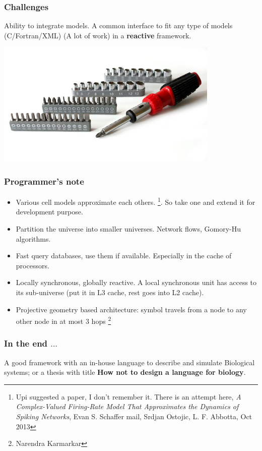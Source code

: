 \documentclass{beamer}
\begin{document}
\begin{frame}
\frametitle{Challenges}

Ability to integrate models. A common interface to fit any type of models
(C/Fortran/XML) (A lot of work) in a \textbf{reactive} framework.

  \includegraphics[width=0.8\textwidth]{./figures/multi-head-screwdriver.jpg}

\end{frame}

\begin{frame}
  \frametitle{Programmer's note}

  \begin{itemize}
    
    \item Various cell models approximate each others. \footnote{Upi suggested a
      paper, I don't remember it. There is an attempt here, \textit{A
    Complex-Valued Firing-Rate Model That Approximates the Dynamics of Spiking
Networks}, Evan S. Schaffer mail, Srdjan Ostojic, L. F. Abbotta, Oct 2013}. So
take one and extend it for development purpose.
    
    \item Partition the universe into smaller universes. Network flows,
      Gomory-Hu algorithms.
    \item Fast query databases, use them if available. Especially in the cache
      of processors.
    \item Locally synchronous, globally reactive.
A local synchronous unit has access to its sub-universe (put it in L3 cache,
rest goes into L2 cache).
    \item Projective geometry based architecture: symbol travels from  a node to
      any other node in at most 3 hops \footnote{Narendra Karmarkar}
  \end{itemize}
\end{frame}

\begin{frame}
  \frametitle{In the end $\ldots$}

  A good framework with an in-house language to describe and simulate Biological
  systems; or a thesis with title \textbf{How not to design a language for
  biology}.

\end{frame}
\end{document}
